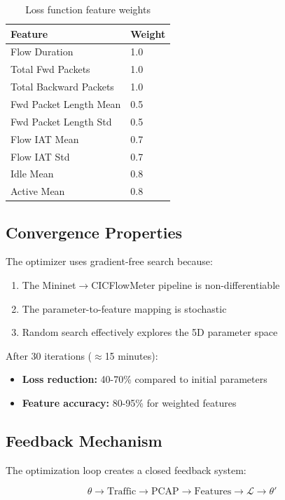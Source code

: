 \documentclass[11pt,a4paper]{article}
\begin{document}
\begin{table}[h]
\centering
\begin{tabular}{@{}ll@{}}
\toprule
\textbf{Feature} & \textbf{Weight} \\
\midrule
Flow Duration & 1.0 \\
Total Fwd Packets & 1.0 \\
Total Backward Packets & 1.0 \\
Fwd Packet Length Mean & 0.5 \\
Fwd Packet Length Std & 0.5 \\
Flow IAT Mean & 0.7 \\
Flow IAT Std & 0.7 \\
Idle Mean & 0.8 \\
Active Mean & 0.8 \\
\bottomrule
\end{tabular}
\caption{Loss function feature weights}
\end{table}

\subsection{Convergence Properties}

The optimizer uses gradient-free search because:
\begin{enumerate}
    \item The Mininet$\rightarrow$CICFlowMeter pipeline is non-differentiable
    \item The parameter-to-feature mapping is stochastic
    \item Random search effectively explores the 5D parameter space
\end{enumerate}

After 30 iterations ($\approx$15 minutes):
\begin{itemize}
    \item \textbf{Loss reduction:} 40-70\% compared to initial parameters
    \item \textbf{Feature accuracy:} 80-95\% for weighted features
\end{itemize}

\subsection{Feedback Mechanism}

The optimization loop creates a closed feedback system:

\begin{equation}
\theta \rightarrow \text{Traffic} \rightarrow \text{PCAP} \rightarrow \text{Features} \rightarrow \mathcal{L} \rightarrow \theta'
\end{equation}
\end{document}
